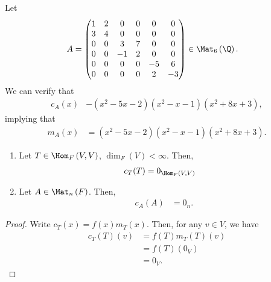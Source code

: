 \documentclass[10pt]{mypackage}
\begin{document}
\begin{example}
  Let
  \begin{align*}
    A &= \begin{pmatrix}1 & 2 & 0 & 0 & 0 & 0 \\ 3 & 4 & 0 & 0 & 0 & 0 \\ 0 & 0 & 3 & 7 & 0 & 0 \\ 0 & 0 & -1 & 2 & 0 & 0 \\ 0 & 0 & 0 & 0 & -5 & 6 \\ 0 & 0 & 0 & 0 & 2 & -3\end{pmatrix}\in \Mat_{6}\left(\Q\right).
  \end{align*}
  We can verify that
  \begin{align*}
    c_A(x) &- \left(x^{2}-5x-2\right)\left(x^2 - x - 1\right)\left(x^2 + 8x + 3\right),
  \end{align*}
  implying that
  \begin{align*}
    m_{A}\left(x\right) &= \left(x^{2}-5x-2\right)\left(x^2 - x - 1\right)\left(x^2 + 8x + 3\right).
  \end{align*}
\end{example}
\begin{theorem}\hfill
  \begin{enumerate}[(1)]
    \item Let $T\in \Hom_{F}\left(V,V\right)$, $\dim_{F}\left(V\right) < \infty$. Then,
      \begin{align*}
        c_T(T) &= 0_{\Hom_{F}\left(V,V\right)}
      \end{align*}
    \item Let $A\in \Mat_{n}\left(F\right)$. Then,
      \begin{align*}
        c_A(A) &= 0_{n}.
      \end{align*}
  \end{enumerate}
\end{theorem}
\begin{proof}
  Write $c_T(x) = f(x)m_T(x)$. Then, for any $v\in V$, we have
  \begin{align*}
    c_T(T)(v) &= f(T)m_T(T)(v)\\
              &= f(T)\left(0_V\right)\\
              &= 0_V.
  \end{align*}
\end{proof}
\end{document}
